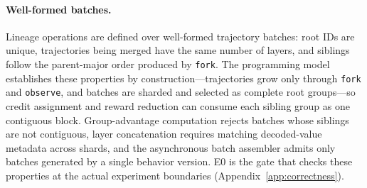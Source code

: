 \documentclass[10pt]{article}
\begin{document}
\paragraph{Well-formed batches.}
Lineage operations are defined over well-formed trajectory batches: root IDs are unique, trajectories being merged have the same number of layers, and siblings follow the parent-major order produced by \texttt{fork}.
The programming model establishes these properties by construction---trajectories grow only through \texttt{fork} and \texttt{observe}, and batches are sharded and selected as complete root groups---so credit assignment and reward reduction can consume each sibling group as one contiguous block.
Group-advantage computation rejects batches whose siblings are not contiguous, layer concatenation requires matching decoded-value metadata across shards, and the asynchronous batch assembler admits only batches generated by a single behavior version.
E0 is the gate that checks these properties at the actual experiment boundaries (Appendix~\ref{app:correctness}).
\end{document}
